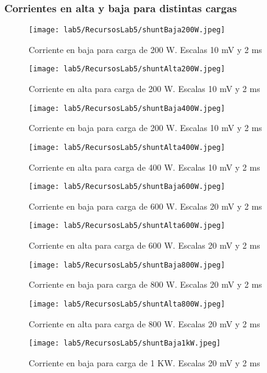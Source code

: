 \documentclass[11pt,letterpaper]{article}     %
\begin{document}
\subsubsection{Corrientes en alta y baja para distintas cargas}
\begin{figure}[H]
    \centering
    \texttt{[image: lab5/RecursosLab5/shuntBaja200W.jpeg]}
    \caption{Corriente en baja para carga de 200 W. Escalas 10 mV y 2 ms}
    \label{shuntBaja200W}
\end{figure}
\begin{figure}[H]
    \centering
    \texttt{[image: lab5/RecursosLab5/shuntAlta200W.jpeg]}
    \caption{Corriente en alta para carga de 200 W. Escalas 10 mV y 2 ms}
    \label{shuntAlta200W}
\end{figure}
\begin{figure}[H]
    \centering
    \texttt{[image: lab5/RecursosLab5/shuntBaja400W.jpeg]}
    \caption{Corriente en baja para carga de 200 W. Escalas 10 mV y 2 ms}
    \label{shuntBaja400W}
\end{figure}
\begin{figure}[H]
    \centering
    \texttt{[image: lab5/RecursosLab5/shuntAlta400W.jpeg]}
    \caption{Corriente en alta para carga de 400 W. Escalas 10 mV y 2 ms}
    \label{shuntAlta400W}
\end{figure}
\begin{figure}[H]
    \centering
    \texttt{[image: lab5/RecursosLab5/shuntBaja600W.jpeg]}
    \caption{Corriente en baja para carga de 600 W. Escalas 20 mV y 2 ms}
    \label{shuntBaja600W}
\end{figure}
\begin{figure}[H]
    \centering
    \texttt{[image: lab5/RecursosLab5/shuntAlta600W.jpeg]}
    \caption{Corriente en alta para carga de 600 W. Escalas 20 mV y 2 ms}
    \label{shuntAlta600W}
\end{figure}
\begin{figure}[H]
    \centering
    \texttt{[image: lab5/RecursosLab5/shuntBaja800W.jpeg]}
    \caption{Corriente en baja para carga de 800 W. Escalas 20 mV y 2 ms}
    \label{shuntBaja800W}
\end{figure}
\begin{figure}[H]
    \centering
    \texttt{[image: lab5/RecursosLab5/shuntAlta800W.jpeg]}
    \caption{Corriente en alta para carga de 800 W. Escalas 20 mV y 2 ms}
    \label{shuntAlta800W}
\end{figure}
\begin{figure}[H]
    \centering
    \texttt{[image: lab5/RecursosLab5/shuntBaja1kW.jpeg]}
    \caption{Corriente en baja para carga de 1 KW. Escalas 20 mV y 2 ms}
    \label{shuntBaja1KW}
\end{figure}
\end{document}
